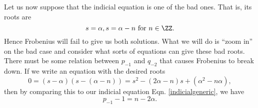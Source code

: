 Let us now suppose that the indicial equation is one of the bad ones. That is, its roots are 
\begin{equation}
    s=\alpha, s=\alpha-n\text{ for }n\in \ZZ.
\end{equation}
Hence Frobenius will fail to give us both solutions. What we will do is ``zoom in'' on the bad case and consider what sorts of equations can give these bad roots. There must be some relation between $p_{-1}$ and $q_{-2}$ that causes Frobenius to break down. If we write an equation with the desired roots
\begin{equation}
    0=(s-\alpha)(s-(\alpha-n)) = s^2 -(2\alpha -n)s +(\alpha^2 -n\alpha),
\end{equation}
then by comparing this to our indicial equation Eqn. \ref{indicialgeneric}, we have
\begin{equation}
    p_{-1} - 1 = n-2\alpha.
\end{equation}